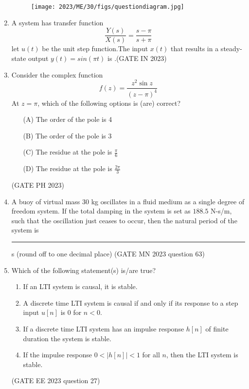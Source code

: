 \begin{enumerate}[label=\thechapter.\arabic*,ref=\thechapter.\theenumi]
\begin{figure}[!ht]
\centering
\begin{center}
\texttt{[image: 2023/ME/30/figs/questiondiagram.jpg]}
\end{center}
\end{figure}
\solution

\newpage

\item A system has transfer function
 \[\frac{Y(s)}{X(s)}=\frac {s-\pi}{s+\pi}\]
 let $u(t)$ be the unit step function.The input $x(t)$ that results in a steady-state output $y(t)=sin(\pi t)$ is \underline{\quad}.\hfill (GATE IN 2023)\\
 \solution
 
 \newpage

\item Consider the complex function
\[ f(z) = \frac{z^{2}\sin z}{(z-\pi)^4} \]
At \( z = \pi \), which of the following options is (are) correct?
\begin{enumerate}[label=\textbf{\arabic*.}, font=\bfseries, align=left]
    \item[(A)] The order of the pole is 4 
    \item[(B)] The order of the pole is 3 
    \item[(C)] The residue at the pole is \( \frac{\pi}{6} \)
    \item[(D)] The residue at the pole is \( \frac{2\pi}{3} \)
\end{enumerate}
\hfill (GATE PH 2023)
\solution

\newpage
 \item
 A buoy of virtual mass $30$ kg oscillates in a fluid medium as a single degree of
freedom system. If the total damping in the system is set as $188.5$ N-s/m, such
that the oscillation just ceases to occur, then the natural period of the system is
\rule{1cm}{0.15mm} s (round off to one decimal place)
\hfill(GATE MN 2023 question 63)\\
\solution 

\newpage
\item 
Which of the following statement(s) is/are true?
\begin{enumerate}[label=(\alph*)]
	\item If an LTI system is causal, it is stable.
	\item A discrete time LTI system is causal if and only if its response to a step input $u[n]$ is 0 for $n < 0$.
	\item If a discrete time LTI system has an impulse response $h[n]$ of finite duration the system is stable.
	\item If the impulse response $0 < |h[n]| < 1$ for all $n$, then the LTI system is stable.
\end{enumerate}
\hfill (GATE EE 2023 question 27)\\
\solution

\newpage


\end{enumerate}
